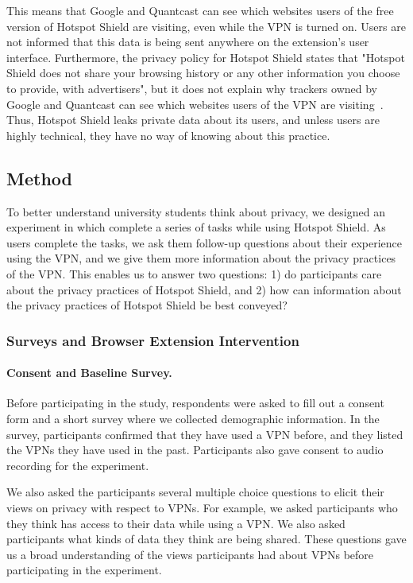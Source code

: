 This means that Google and Quantcast can see which websites users of the free version of Hotspot Shield are visiting, even while the VPN is turned on. Users are not informed that this data is being sent anywhere on the extension's user interface. Furthermore, the privacy policy for Hotspot Shield states that "Hotspot Shield does not share your browsing history or any other information you choose to provide, with advertisers", but it does not explain why trackers owned by Google and Quantcast can see which websites users of the VPN are visiting~\cite{hotspot_privacy}. Thus, Hotspot Shield leaks private data about its users, and unless users are highly technical, they have no way of knowing about this practice.

\subsection{Method}\label{sec:experiment_method}

To better understand university students think about privacy, we designed an experiment in which complete a series of tasks while using Hotspot Shield. As users complete the tasks, we ask them follow-up questions about their experience using the VPN, and we give them more information about the privacy practices of the VPN. This enables us to answer two questions: 1) do participants care about the privacy practices of Hotspot Shield, and 2) how can information about the privacy practices of Hotspot Shield be best conveyed?

\subsubsection{Surveys and Browser Extension Intervention}

\paragraph{Consent and Baseline Survey.}
Before participating in the study, respondents were asked to fill out a
consent form and a short survey where we collected demographic information.
In the survey, participants confirmed that they have used a VPN before, and
they listed the VPNs they have used in the past.  Participants also gave
consent to audio recording for the experiment.

We also asked the participants several multiple choice questions to elicit
their views on privacy with respect to VPNs.  For example, we asked
participants who they think has access to their data while using a VPN.  We
also asked participants what kinds of data they think are being shared.  These
questions gave us a broad understanding of the views participants had about
VPNs before participating in the experiment.

